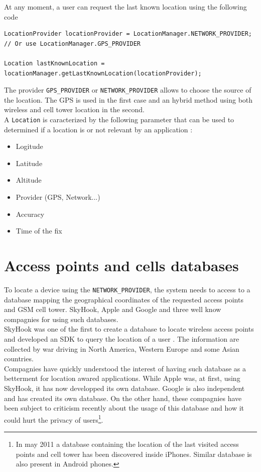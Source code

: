 At any moment, a user can request the last known location using the following code

\begin{lstlisting}[label=getLastKnown,caption=Get the last recorded location]
LocationProvider locationProvider = LocationManager.NETWORK_PROVIDER;
// Or use LocationManager.GPS_PROVIDER

Location lastKnownLocation = locationManager.getLastKnownLocation(locationProvider);
\end{lstlisting}

The provider \texttt{GPS\_PROVIDER}  or \texttt{NETWORK\_PROVIDER} allows to choose the source of the location. The GPS is used in the first case and an hybrid method using both wireless and cell tower location in the second.\\

A \texttt{Location} is caracterized by the following parameter that can be used to determined if a location is or not relevant by an application :
\begin{itemize}
\item Logitude
\item Latitude
\item Altitude
\item Provider (GPS, Network...)
\item Accuracy
\item Time of the fix
\end{itemize}


\section{Access points and cells databases}
\label{sec:andro-cell-db}

To locate a device using the \texttt{NETWORK\_PROVIDER}, the system needs to access to a database mapping the geographical coordinates of the requested access points and GSM cell tower. SkyHook, Apple and Google and three well know compagnies for using such databases.\\

SkyHook was one of the first to create a database to locate wireless access points and developed an SDK to query the location of a user .
The information are collected by war driving in North America, Western Europe and some Asian countries\cite{skyhook-coverage}.\\

Compagnies have quickly understood the interest of having such database as a betterment for location awared applications.
While Apple was, at first, using SkyHook, it has now developped its own database. Google is also independent and has created its own database.
On the other hand, these compagnies have been subject to criticism recently about the usage of this database and how it could hurt the privacy of users\footnote{In may 2011 a database containing the location of the last visited access points and cell tower has been discovered inside iPhones. Similar database is also present in Android phones.}.

